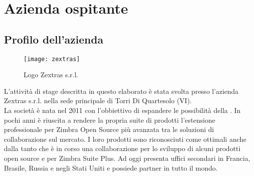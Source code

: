\chapter{Azienda ospitante}\label{chap:company}

\section{Profilo dell'azienda}
\begin{figure}[H] 
	\centering
	\texttt{[image: zextras]}
	\caption{Logo Zextras s.r.l.}
	\label{fig:logoZextras}
\end{figure}
L'attività di stage descritta in questo elaborato è stata svolta presso l'azienda Zextras s.r.l. nella sede principale di Torri Di Quartesolo (VI). \\
La società è nata nel 2011 con l'obbiettivo di espandere le possibilità della .
In pochi anni è riuscita a rendere la propria suite di prodotti l'estensione professionale per Zimbra Open Source più avanzata tra le soluzioni di collaborazione sul mercato. I loro prodotti sono riconosciuti come ottimali anche dalla  tanto che è in corso una collaborazione per lo sviluppo di alcuni prodotti open source e per Zimbra Suite Plus.
Ad oggi presenta uffici secondari in Francia, Brasile, Russia e negli Stati Uniti e possiede partner in tutto il mondo.\\


